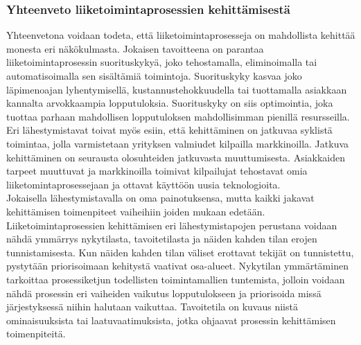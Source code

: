 \documentclass[finnish,12pt,a4paper,pdftex]{article}
\begin{document}


\subsubsection{Yhteenveto liiketoimintaprosessien kehittämisestä}


Yhteenvetona voidaan todeta, että liiketoimintaprosesseja on mahdollista kehittää monesta eri näkökulmasta. Jokaisen tavoitteena on parantaa liiketoimintaprosessin suorituskykyä, joko tehostamalla, eliminoimalla tai automatisoimalla sen sisältämiä toimintoja. Suorituskyky kasvaa joko läpimenoajan lyhentymisellä, kustannustehokkuudella tai tuottamalla asiakkaan kannalta arvokkaampia lopputuloksia. Suorituskyky on siis optimointia, joka tuottaa parhaan mahdollisen lopputuloksen mahdollisimman pienillä resursseilla. \\

Eri lähestymistavat toivat myös esiin, että kehittäminen on jatkuvaa syklistä toimintaa, jolla varmistetaan yrityksen valmiudet kilpailla markkinoilla. Jatkuva kehittäminen on seurausta olosuhteiden jatkuvasta muuttumisesta. Asiakkaiden tarpeet muuttuvat ja markkinoilla toimivat kilpailujat tehostavat omia liiketomintaprosessejaan ja ottavat käyttöön uusia teknologioita.\\

Jokaisella lähestymistavalla on oma painotuksensa, mutta kaikki jakavat kehittämisen toimenpiteet vaiheihiin joiden mukaan edetään. Liiketoimintaprosessien kehittämisen eri lähestymistapojen perustana voidaan nähdä ymmärrys nykytilasta, tavoitetilasta ja näiden kahden tilan erojen tunnistamisesta. Kun näiden kahden tilan väliset erottavat tekijät on tunnistettu, pystytään priorisoimaan kehitystä vaativat osa-alueet. Nykytilan ymmärtäminen tarkoittaa prosessiketjun todellisten toimintamallien tuntemista, jolloin voidaan nähdä prosessin eri vaiheiden vaikutus lopputulokseen ja priorisoida missä järjestyksessä niihin halutaan vaikuttaa. Tavoitetila on kuvaus niistä ominaisuuksista tai laatuvaatimuksista, jotka ohjaavat prosessin kehittämisen toimenpiteitä.\\
\end{document}
